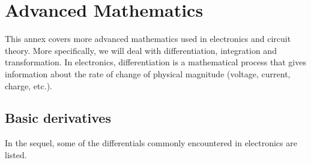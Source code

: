 \chapter{Advanced Mathematics}

\begin{summary}
This annex covers more advanced mathematics used in electronics and circuit theory. More specifically, we will deal with differentiation, integration and transformation. In electronics, differentiation is a mathematical process that gives information about the rate of change of physical magnitude (voltage, current, charge, etc.).
\end{summary}

\section{Basic derivatives}
In the sequel, some of the differentials commonly encountered in electronics are listed.

